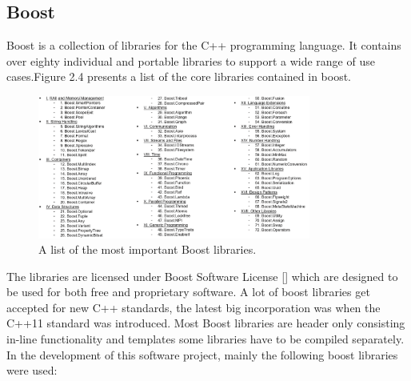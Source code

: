 \subsection{Boost}
Boost is a collection of libraries for the C++ programming language. It contains over eighty individual and portable libraries to support a wide range of use cases.Figure 2.4 presents a list of the core libraries contained in boost.
\begin{figure}[h]
\centering
      \includegraphics[width=0.8\textwidth]{boost}
        \caption{A list of the most important Boost libraries.}
\end{figure}
The libraries are licensed under Boost Software License [] which are designed to be used for both free and proprietary software. A lot of boost libraries get accepted for new C++ standards, the latest big incorporation was when the C++11 standard was introduced. Most Boost libraries are header only consisting in-line functionality and templates some libraries have to be compiled separately.\\
In the development of this software project, mainly the following boost libraries were used:
